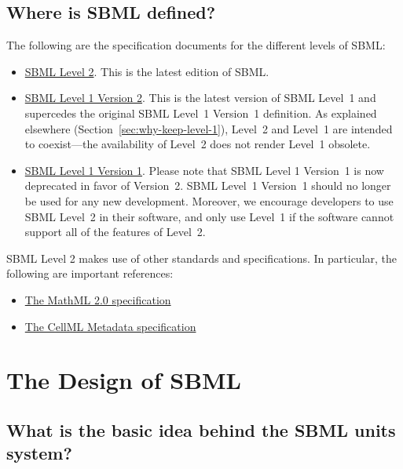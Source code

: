 \documentclass{sbmlfaq}
\begin{document}
\subsection{Where is SBML defined?}
\label{sec:spec-docs}
The following are the specification documents for the different levels of
SBML:

\begin{itemize}
  
\item \href{http://www.sbw-sbml.org/sbml/docs/index.html}{SBML Level 2}.
  This is the latest edition of SBML.
  
\item \href{http://www.sbw-sbml.org/sbml/docs/index.html}{SBML Level 1
    Version 2}.  This is the latest version of SBML Level~1 and supercedes
  the original SBML Level~1 Version~1 definition.  As explained elsewhere
  (Section~\ref{sec:why-keep-level-1}), Level~2 and Level~1 are intended to
  coexist---the availability of Level~2 does not render Level~1 obsolete.
  
\item \href{http://www.sbw-sbml.org/sbml/docs/index.html}{SBML Level 1
    Version 1}.  Please note that SBML Level 1 Version~1 is now deprecated
  in favor of Version~2.  SBML Level~1 Version~1 should no longer be used
  for any new development.  Moreover, we encourage developers to use SBML
  Level~2 in their software, and only use Level~1 if the software cannot
  support all of the features of Level~2.

\end{itemize}

SBML Level 2 makes use of other standards and specifications.  In
particular, the following are important references:

\begin{itemize}

\item \href{http://www.w3.org/TR/2003/WD-MathML2-20030411/}{The MathML 2.0 specification}

\item \href{http://www.cellml.org/public/metadata/}{The CellML Metadata specification}

\end{itemize}


\section{The Design of SBML}

\subsection{What is the basic idea behind the SBML units system?}
\end{document}
